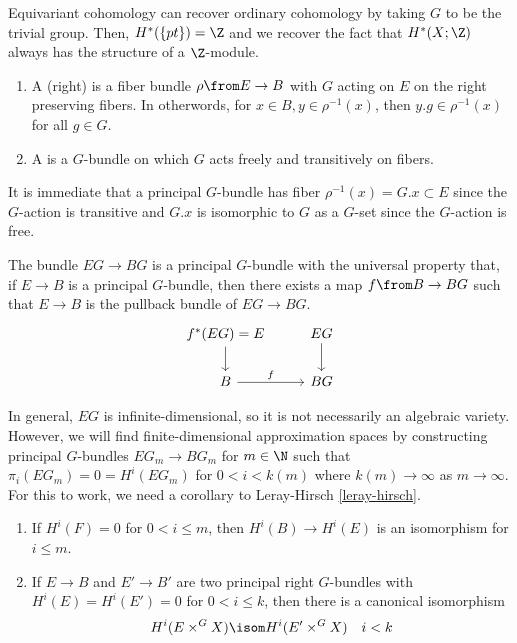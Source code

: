 \documentclass[11pt,leqno,oneside]{amsbook}
\numberwithin{thm}{section}
\begin{document}
\begin{rmk}
  Equivariant cohomology can recover ordinary cohomology by taking
  \(G\) to be the trivial group. Then, \(H^*(\{pt\}) = \Z\) and we
  recover the fact that \(H^*(X;\Z)\) always has the structure of a
  \(\Z\)-module. 
\end{rmk}
\begin{defn}
  \begin{enumerate}
  \item A (right)  is a fiber bundle
    \(\rho \from E \to B\) with \(G\) acting on \(E\) on the right
    preserving fibers. In otherwords, for \(x \in B, y \in
    \rho^{-1}(x)\), then \(y.g \in \rho^{-1}(x)\) for all \(g \in G\).
  \item A  is a \(G\)-bundle on which \(G\)
    acts freely and transitively on fibers. 
  \end{enumerate}
\end{defn}
\begin{rmk}
  It is immediate that a principal \(G\)-bundle has fiber \(\rho^{-1}(x) = G.x
  \subset E\) since the \(G\)-action is transitive and \(G.x\) is
  isomorphic to \(G\) as a \(G\)-set since the \(G\)-action is free.
\end{rmk}
\begin{prop}
  The bundle \(EG \to BG\) is a principal \(G\)-bundle with the
  universal property that, if \(E \to B\) is a principal \(G\)-bundle,
  then there exists a map \(f \from B \to BG\) such that \(E \to B\)
  is the pullback bundle of \(EG \to BG\).\[
    \begin{tikzcd}
      f^*(EG) = E \ar[d] & EG \ar[d]\\
      B \ar[r,"f"] & BG
    \end{tikzcd}
  \]
\end{prop}
In general, \(EG\) is infinite-dimensional, so it is not necessarily
an algebraic variety. However, we will find finite-dimensional
approximation spaces by constructing principal \(G\)-bundles \(EG_m
\to BG_m\) for \(m \in \N\) such that \(\pi_i(EG_m) = 0 = H^i(EG_m)\)
for \(0 < i < k(m)\) where \(k(m) \to \infty\) as \(m \to
\infty\). For this to work, we need a corollary to Leray-Hirsch \ref{leray-hirsch}.
\begin{cor}
  \begin{enumerate}
  \item If \(H^i(F) = 0\) for \(0 < i \leq m\), then
    \(H^i(B) \to H^i(E)\) is an isomorphism for \(i \leq m\).
  \item If \(E \to B\) and \(E' \to B'\) are two principal right
    \(G\)-bundles with \(H^i(E) = H^i(E') = 0\) for \(0 < i \leq k\), then
    there is a canonical isomorphism \[
      H^i(E \times^G X) \isom H^i(E' \times^G X) \ \ \ i < k
    \]
  \end{enumerate}
\end{cor}
\end{document}
